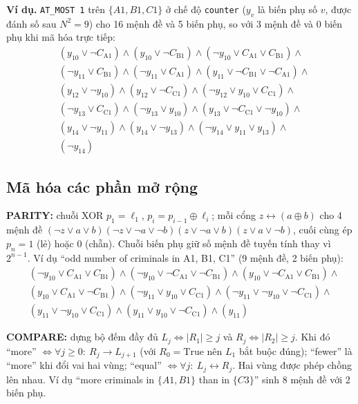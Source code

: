 \documentclass{article}
\newcommand{\code}[1]{\texttt{#1}}
\begin{document}
\textbf{Ví dụ.} \code{AT\_MOST 1} trên $\{A1,B1,C1\}$ ở chế độ \code{counter} ($y_v$ là biến phụ số $v$, được đánh số sau $N^2 = 9$) cho 16 mệnh đề và 5 biến phụ, so với 3 mệnh đề và 0 biến phụ khi mã hóa trực tiếp:
\begin{align*}
& (y_{10} \lor \neg C_{\mathrm{A1}}) \land (y_{10} \lor \neg C_{\mathrm{B1}}) \land (\neg y_{10} \lor C_{\mathrm{A1}} \lor C_{\mathrm{B1}}) \land \\
& (\neg y_{11} \lor C_{\mathrm{B1}}) \land (\neg y_{11} \lor C_{\mathrm{A1}}) \land (y_{11} \lor \neg C_{\mathrm{B1}} \lor \neg C_{\mathrm{A1}}) \land \\
& (y_{12} \lor \neg y_{10}) \land (y_{12} \lor \neg C_{\mathrm{C1}}) \land (\neg y_{12} \lor y_{10} \lor C_{\mathrm{C1}}) \land \\
& (\neg y_{13} \lor C_{\mathrm{C1}}) \land (\neg y_{13} \lor y_{10}) \land (y_{13} \lor \neg C_{\mathrm{C1}} \lor \neg y_{10}) \land \\
& (y_{14} \lor \neg y_{11}) \land (y_{14} \lor \neg y_{13}) \land (\neg y_{14} \lor y_{11} \lor y_{13}) \land \\
& (\neg y_{14})
\end{align*}

\subsection{Mã hóa các phần mở rộng}
\textbf{PARITY:} chuỗi XOR $p_1 = \ell_1$, $p_i = p_{i-1} \oplus \ell_i$; mỗi cổng $z \leftrightarrow (a \oplus b)$ cho 4 mệnh đề $(\neg z\lor a\lor b)(\neg z\lor\neg a\lor\neg b)(z\lor\neg a\lor b)(z\lor a\lor\neg b)$, cuối cùng ép $p_n = 1$ (lẻ) hoặc $0$ (chẵn). Chuỗi biến phụ giữ số mệnh đề tuyến tính thay vì $2^{n-1}$. Ví dụ ``odd number of criminals in A1, B1, C1'' (9 mệnh đề, 2 biến phụ):
\begin{align*}
& (\neg y_{10} \lor C_{\mathrm{A1}} \lor C_{\mathrm{B1}}) \land (\neg y_{10} \lor \neg C_{\mathrm{A1}} \lor \neg C_{\mathrm{B1}}) \land (y_{10} \lor \neg C_{\mathrm{A1}} \lor C_{\mathrm{B1}}) \land \\
& (y_{10} \lor C_{\mathrm{A1}} \lor \neg C_{\mathrm{B1}}) \land (\neg y_{11} \lor y_{10} \lor C_{\mathrm{C1}}) \land (\neg y_{11} \lor \neg y_{10} \lor \neg C_{\mathrm{C1}}) \land \\
& (y_{11} \lor \neg y_{10} \lor C_{\mathrm{C1}}) \land (y_{11} \lor y_{10} \lor \neg C_{\mathrm{C1}}) \land (y_{11})
\end{align*}

\textbf{COMPARE:} dựng bộ đếm đầy đủ $L_j \iff |R_1| \ge j$ và $R_j \iff |R_2| \ge j$. Khi đó ``more'' $\iff \forall j \ge 0:\ R_j \to L_{j+1}$ (với $R_0 = \text{True}$ nên $L_1$ bắt buộc đúng); ``fewer'' là ``more'' khi đổi vai hai vùng; ``equal'' $\iff \forall j:\ L_j \leftrightarrow R_j$. Hai vùng được phép chồng lên nhau. Ví dụ ``more criminals in $\{A1,B1\}$ than in $\{C3\}$'' sinh 8 mệnh đề với 2 biến phụ.
\end{document}
